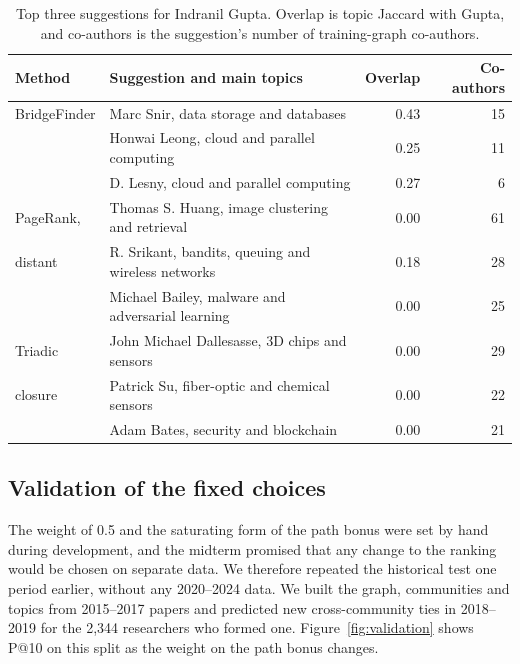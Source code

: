 \documentclass[sigconf,nonacm]{acmart}
\begin{document}
\begin{table}[t]
\caption{Top three suggestions for Indranil Gupta. Overlap is topic Jaccard with Gupta, and co-authors is the suggestion's number of training-graph co-authors.}
\label{tab:example}
\small
\setlength{\tabcolsep}{3pt}
\begin{tabularx}{\columnwidth}{@{}l>{\raggedright\arraybackslash}Xrr@{}}
\toprule
Method & Suggestion and main topics & Overlap & Co-authors\\
\midrule
BridgeFinder & Marc Snir, data storage and databases & 0.43 & 15\\
 & Honwai Leong, cloud and parallel computing & 0.25 & 11\\
 & D. Lesny, cloud and parallel computing & 0.27 & 6\\
\midrule
PageRank, & Thomas S. Huang, image clustering and retrieval & 0.00 & 61\\
distant & R. Srikant, bandits, queuing and wireless networks & 0.18 & 28\\
 & Michael Bailey, malware and adversarial learning & 0.00 & 25\\
\midrule
Triadic & John Michael Dallesasse, 3D chips and sensors & 0.00 & 29\\
closure & Patrick Su, fiber-optic and chemical sensors & 0.00 & 22\\
 & Adam Bates, security and blockchain & 0.00 & 21\\
\bottomrule
\end{tabularx}
\end{table}

\subsection{Validation of the fixed choices}\label{sec:validation}
The weight of 0.5 and the saturating form of the path bonus were set by hand during development, and the midterm promised that any change to the ranking would be chosen on separate data. We therefore repeated the historical test one period earlier, without any 2020--2024 data. We built the graph, communities and topics from 2015--2017 papers and predicted new cross-community ties in 2018--2019 for the 2,344 researchers who formed one. Figure~\ref{fig:validation} shows P@10 on this split as the weight on the path bonus changes.
\end{document}
